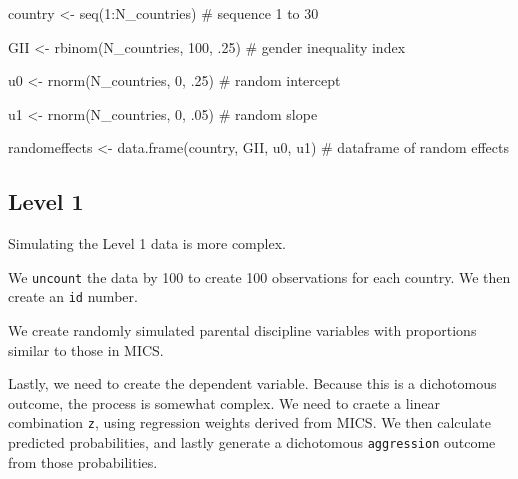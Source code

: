 \documentclass[
  letterpaper,
  DIV=11,
  numbers=noendperiod]{scrreprt}
\newenvironment{Shaded}{\begin{snugshade}}{\end{snugshade}}
\newcommand{\CommentTok}[1]{\textcolor[rgb]{0.37,0.37,0.37}{#1}}
\newcommand{\DecValTok}[1]{\textcolor[rgb]{0.68,0.00,0.00}{#1}}
\newcommand{\FunctionTok}[1]{\textcolor[rgb]{0.28,0.35,0.67}{#1}}
\newcommand{\NormalTok}[1]{\textcolor[rgb]{0.00,0.23,0.31}{#1}}
\newcommand{\OtherTok}[1]{\textcolor[rgb]{0.00,0.23,0.31}{#1}}
\newcommand{\SpecialCharTok}[1]{\textcolor[rgb]{0.37,0.37,0.37}{#1}}
\begin{document}
\begin{Shaded}
\begin{Highlighting}[]
\NormalTok{country }\OtherTok{\textless{}{-}} \FunctionTok{seq}\NormalTok{(}\DecValTok{1}\SpecialCharTok{:}\NormalTok{N\_countries) }\CommentTok{\# sequence 1 to 30}

\NormalTok{GII }\OtherTok{\textless{}{-}} \FunctionTok{rbinom}\NormalTok{(N\_countries, }\DecValTok{100}\NormalTok{, .}\DecValTok{25}\NormalTok{) }\CommentTok{\# gender inequality index}

\NormalTok{u0 }\OtherTok{\textless{}{-}} \FunctionTok{rnorm}\NormalTok{(N\_countries, }\DecValTok{0}\NormalTok{, .}\DecValTok{25}\NormalTok{) }\CommentTok{\# random intercept}

\NormalTok{u1 }\OtherTok{\textless{}{-}} \FunctionTok{rnorm}\NormalTok{(N\_countries, }\DecValTok{0}\NormalTok{, .}\DecValTok{05}\NormalTok{) }\CommentTok{\# random slope}

\NormalTok{randomeffects }\OtherTok{\textless{}{-}} \FunctionTok{data.frame}\NormalTok{(country, GII, u0, u1) }\CommentTok{\# dataframe of random effects}
\end{Highlighting}
\end{Shaded}

\hypertarget{level-1}{%
\subsection{Level 1}\label{level-1}}

Simulating the Level 1 data is more complex.

We \texttt{uncount} the data by 100 to create 100 observations for each
country. We then create an \texttt{id} number.

We create randomly simulated parental discipline variables with
proportions similar to those in MICS.

Lastly, we need to create the dependent variable. Because this is a
dichotomous outcome, the process is somewhat complex. We need to craete
a linear combination \texttt{z}, using regression weights derived from
MICS. We then calculate predicted probabilities, and lastly generate a
dichotomous \texttt{aggression} outcome from those probabilities.
\end{document}
